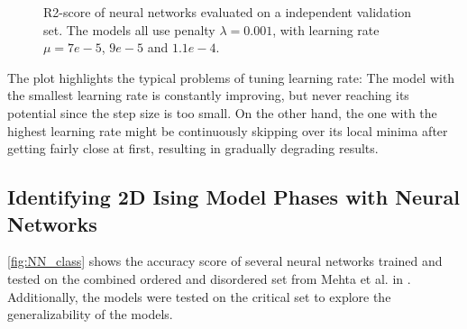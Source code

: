 \begin{figure}[H]
\centering
{}
\caption{R2-score of neural networks evaluated on a independent validation set. The models all use penalty $\lambda = 0.001$, with learning rate $\mu = 7e-5$, $9e-5$ and $1.1e-4$.}
\label{fig:NN_learn}
\end{figure}

The plot highlights the typical problems of tuning learning rate: The model with the smallest learning rate is constantly improving, but never reaching its potential since the step size is too small. On the other hand, the one with the highest learning rate might be continuously skipping over its local minima after getting fairly close at first, resulting in gradually degrading results.   


\subsection{Identifying 2D Ising Model Phases with Neural Networks}\label{sec:results NN reg}

\autoref{fig:NN_class} shows the accuracy score of several neural networks trained and tested on the combined ordered and disordered set from Mehta et al. in \cite{Mehta_2019}. Additionally, the models were tested on the critical set to explore the generalizability of the models.

